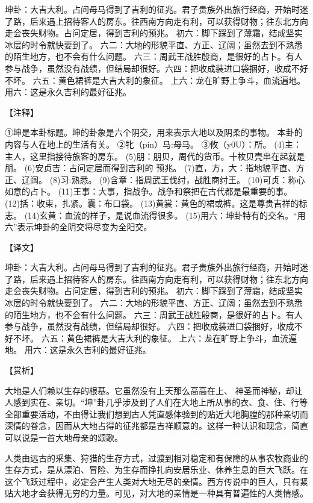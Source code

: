 \documentclass[12pt,UTF8]{ctexbook}
\begin{document}
坤卦：大吉大利。占问母马得到了吉利的征兆。君子贵族外出旅行经商，开始时迷了路，后来遇上招待客人的房东。往西南方向走有利，可以获得财物；往东北方向走会丧失财物。占问定居，得到吉利的预兆。 初六：脚下踩到了薄霜，结成坚实冰层的时令就快要到了。 六二：大地的形貌平直、方正、辽阔；虽然去到不熟悉的陌生地方，也不会有什么问题。 六三：周武王战胜殷商，是很好的占卜。有人参与战争，虽然没有战绩，但结局却很好。六四：把收成装进口袋捆好，收成不好不坏。 六五：黄色裙裤是大吉大利的象征。 上六：龙在旷野上争斗，血流遍地。 用六：这是永久吉利的最好征兆。


【注释】

①坤是本卦标题。坤的卦象是六个阴交，用来表示大地以及阴柔的事物。 本卦的内容与人在地上的生活有关。
②牝（pin）马:母马。
③攸（y0U）：所。
(4)主：主人，这里指接待旅客的房东。
(5)朋：朋贝，周代的货币。十枚贝壳串在起就是朋。
(6)安贞吉：占问定居而得到吉利的 预兆。
(7)直，方，大：指地貌平直、方正、辽阔。
(8)习:熟悉。
(9)含章：指周武王伐纣，战胜商纣王。
(10)可贞：称心如意的占卜。
(11)王事：大事，指战争。战争和祭把在古代都是最重要的事。
(12)括：收束，扎紧。囊：布口袋。
(13)黄裳：黄色的裙或裤。这是尊贵吉祥的标志。
(14)玄黄：血流的样子，是说血流得很多。
(15)用六：坤卦特有的交名。“用六”表示坤卦的全阴交将尽变为全阳交。

【译文】

坤卦：大吉大利。占问母马得到了吉利的征兆。君子贵族外出旅行经商，开始时迷了路，后来遇上招待客人的房东。往西南方向走有利，可以获得财物；往东北方向走会丧失财物。占问定居，得到吉利的预兆。
初六：脚下踩到了薄霜，结成坚实冰层的时令就快要到了。
六二：大地的形貌平直、方正、辽阔；虽然去到不熟悉的陌生地方，也不会有什么问题。
六三：周武王战胜殷商，是很好的占卜。有人参与战争，虽然没有战绩，但结局却很好。
六四：把收成装进口袋捆好，收成不好不坏。
六五：黄色裙裤是大吉大利的象征。
上六：龙在旷野上争斗，血流遍地。
用六：这是永久吉利的最好征兆。

【赏析】

大地是人们赖以生存的根基。它虽然没有上天那么高高在上、 神圣而神秘，却让人感到实在、亲切。“坤”卦几乎涉及到了人们在大地上所从事的衣、食、住、行等全部重要活动，不由得让我们想到古人凭直感体验到的贴近大地胸膛的那种亲切而深情的眷念，因而从大地占得的征兆都是吉祥顺意的。这样一种认识和现念，简直可以说是一首大地母亲的颂歌。

人类由远古的采集、狩猎的生存方式，过渡到相对稳定和有保障的从事农牧商业的生存方式，是从漂泊、冒险、为生存而挣扎向安居乐业、休养生息的巨大飞跃。在这个飞跃过程中，必定会产生人类对大地无尽的亲情。西方传说中的巨人，只有紧贴大地才会获得无穷的力量。可见，对大地的亲情是一种具有普遍性的人类情感。
\end{document}
